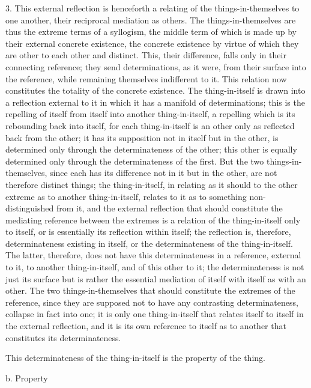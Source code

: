 3. This external reflection is henceforth a relating of
the things-in-themselves to one another,
their reciprocal mediation as others.
The things-in-themselves are thus
the extreme terms of a syllogism,
the middle term of which is made up
by their external concrete existence,
the concrete existence by virtue of which
they are other to each other and distinct.
This, their difference, falls only
in their connecting reference;
they send determinations, as it were,
from their surface into the reference,
while remaining themselves indifferent to it.
This relation now constitutes
the totality of the concrete existence.
The thing-in-itself is drawn into
a reflection external to it
in which it has a manifold of determinations;
this is the repelling of itself from itself
into another thing-in-itself,
a repelling which is its rebounding back into itself,
for each thing-in-itself is an other
only as reflected back from the other;
it has its supposition not in itself but in the other,
is determined only through the determinateness of the other;
this other is equally determined only
through the determinateness of the first.
But the two things-in-themselves,
since each has its difference
not in it but in the other,
are not therefore distinct things;
the thing-in-itself, in relating as it should to
the other extreme as to another thing-in-itself,
relates to it as to something non-distinguished from it,
and the external reflection that should constitute
the mediating reference between the extremes is a
relation of the thing-in-itself only to itself,
or is essentially its reflection within itself;
the reflection is, therefore,
determinateness existing in itself,
or the determinateness of the thing-in-itself.
The latter, therefore, does not have this determinateness
in a reference, external to it,
to another thing-in-itself,
and of this other to it;
the determinateness is not just its surface
but is rather the essential mediation of
itself with itself as with an other.
The two things-in-themselves that should
constitute the extremes of the reference,
since they are supposed not
to have any contrasting determinateness,
collapse in fact into one;
it is only one thing-in-itself that
relates itself to itself in the external reflection,
and it is its own reference to itself as to another
that constitutes its determinateness.

This determinateness of the thing-in-itself is
the property of the thing.

b. Property

